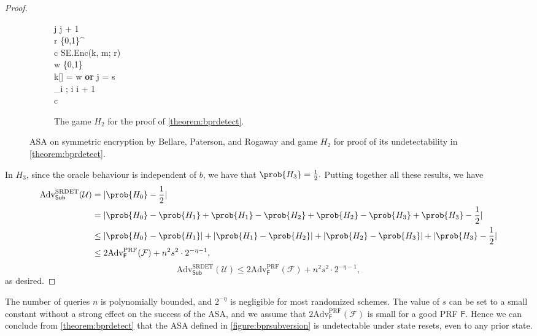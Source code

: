 \begin{proof}
\begin{figure}
\begin{subfigure}[t]{0.6\textwidth}
\begin{pchstack}
{	\pcind \pcind j \leftarrow j + 1 \\
	\pcind \pcind r \sample \{0,1\}^ \\
	\pcind \pcind c \leftarrow \textsf{SE.Enc}(k, m; r) \\
	\pcind \pcind w \sample \{0,1\} \\
	\pcind \pcuntil k[\tau] = w \textbf{ or } j = s\\
	\pcind \tau_i \leftarrow \tau; i \leftarrow i + 1 \\
	\pcreturn c
}
\end{pchstack}
\caption{The game $H_2$ for the proof of \autoref{theorem:bprdetect}.}
\label{game:H2}
\end{subfigure}
\caption[ASA on symmetric encryption by Bellare, Paterson, and Rogaway \cite{C:BelPatRog14} and game $H_2$ for proof of its undetectability in \autoref{theorem:bprdetect}]{ASA on symmetric encryption by Bellare, Paterson, and Rogaway \cite{C:BelPatRog14} and game $H_2$ for proof of its undetectability in \autoref{theorem:bprdetect}.}
\end{figure}
 
In $H_3$, since the oracle behaviour is independent of $b$, we have that $\prob{H_3}= \frac{1}{2}.$ Putting together all these results, we have
\iffullversion
\begin{align*}
\text{Adv}^\text{SRDET}_\textsf{Sub}(\mathcal{U})
&= |\prob{H_0}-\frac{1}{2}| \\
&= |\prob{H_0}-\prob{H_1}+\prob{H_1}-\prob{H_2}+\prob{H_2}-\prob{H_3}+\prob{H_3}-\frac{1}{2}| \\
&\le |\prob{H_0}-\prob{H_1}|+|\prob{H_1}-\prob{H_2}|+|\prob{H_2}-\prob{H_3}|+|\prob{H_3}-\frac{1}{2}| \\
&\le 2\text{Adv}^{\mathrm{PRF}}_\mathsf{F}(\mathcal{F}) + n^2s^2\cdot 2^{-\eta-1},
\end{align*}
\else
\[
\text{Adv}^\text{SRDET}_\textsf{Sub}(\mathcal{U}) \le 2\text{Adv}^{\mathrm{PRF}}_\mathsf{F}(\mathcal{F}) + n^2s^2\cdot 2^{-\eta-1},
\]
\fi
as desired.
\end{proof}

The number of queries $n$ is polynomially bounded, and $2^{-\eta}$ is negligible for most randomized schemes. The value of $s$ can be set to a small constant without a strong effect on the success of the ASA, and we assume that $2\text{Adv}^{\mathrm{PRF}}_\mathsf{F}(\mathcal{F})$ is small for a good PRF $\mathsf{F}$. Hence we can conclude from \autoref{theorem:bprdetect} that the ASA defined in \autoref{figure:bprsubversion} is undetectable under state resets, even to any prior state.

